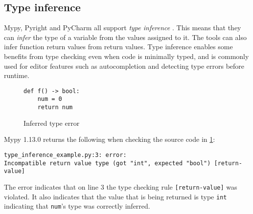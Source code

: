 
\subsection{Type inference}

Mypy, Pyright and PyCharm all support \emph{type inference} \cite{jetbrains_type_hinting_pycharm, mypy_type_inference, pyright_type_inference}. This means that they can \emph{infer} the type of a variable from the values assigned to it. The tools can also infer function return values from return values. Type inference enables some benefits from type checking even when code is minimally typed, and is commonly used for editor features such as autocompletion and detecting type errors before runtime.

\begin{figure}[t]
    \centering
    \begin{minipage}{0.5\textwidth}
        \centering
        \begin{lstlisting}[linewidth=\textwidth]
def f() -> bool:
    num = 0
    return num
        \end{lstlisting}
    \caption{Inferred type error}
    \label{inferred_type_error}
    \end{minipage}
\end{figure}

Mypy 1.13.0 returns the following when checking the source code in \ref{inferred_type_error}: \begin{verbatim}
type_inference_example.py:3: error: 
Incompatible return value type (got "int", expected "bool") [return-value]
\end{verbatim}

The error indicates that on line 3 the type checking rule {\tt [return-value]} was violated. It also indicates that the value that is being returned is type {\tt int} indicating that {\tt num}'s type was correctly inferred.